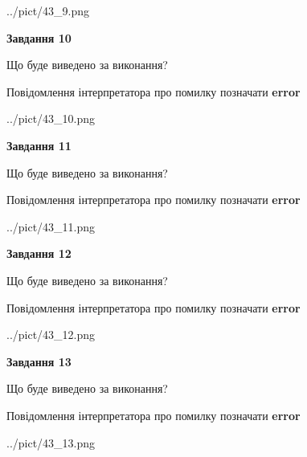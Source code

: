 \documentclass[11pt, ukrainian]{article}
\begin{document}
{\begin {large}
\begin{center}
	{../pict/43_9.png}
\end{center}
\newpage

{\begin {center}\textbf{Завдання 10}\end {center}}\par
Що буде виведено за виконання? \par
Повідомлення інтерпретатора про помилку позначати \textbf{error}

\begin{center}
	{../pict/43_10.png}
\end{center}
\newpage

{\begin {center}\textbf{Завдання 11}\end {center}}\par
Що буде виведено за виконання? \par
Повідомлення інтерпретатора про помилку позначати \textbf{error}

\begin{center}
	{../pict/43_11.png}
\end{center}
\newpage

{\begin {center}\textbf{Завдання 12}\end {center}}\par
Що буде виведено за виконання? \par
Повідомлення інтерпретатора про помилку позначати \textbf{error}

\begin{center}
	{../pict/43_12.png}
\end{center}
\newpage

{\begin {center}\textbf{Завдання 13}\end {center}}\par
Що буде виведено за виконання? \par
Повідомлення інтерпретатора про помилку позначати \textbf{error}

\begin{center}
	{../pict/43_13.png}
\end{center}
\newpage


\end{large}}
\end{document}
